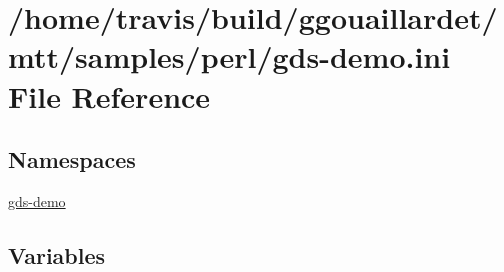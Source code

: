 \hypertarget{gds-demo_8ini}{\section{/home/travis/build/ggouaillardet/mtt/samples/perl/gds-\/demo.ini File Reference}
\label{gds-demo_8ini}
}
\subsection*{Namespaces}
\begin{DoxyCompactItemize}
\item 
\hyperlink{namespacegds-demo}{gds-\/demo}
\end{DoxyCompactItemize}
\subsection*{Variables}

